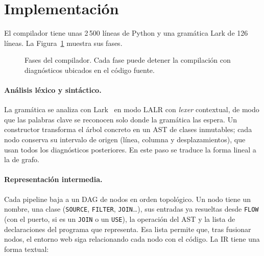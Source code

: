 \documentclass[sigplan,screen,nonacm]{acmart}
\begin{document}
\section{Implementación}
\label{sec:impl}

El compilador tiene unas 2\,500 líneas de Python y una gramática Lark de 126 líneas. La
Figura~\ref{fig:fases} muestra sus fases.

\begin{figure}[t]
\centering
{}
\caption{Fases del compilador. Cada fase puede detener la compilación con diagnósticos
ubicados en el código fuente.}
\label{fig:fases}
\end{figure}

\paragraph{Análisis léxico y sintáctico.}
La gramática se analiza con Lark~\cite{lark} en modo LALR con \emph{lexer} contextual, de
modo que las palabras clave se reconocen solo donde la gramática las espera. Un constructor
transforma el árbol concreto en un AST de clases inmutables; cada nodo conserva su intervalo
de origen (línea, columna y desplazamientos), que usan todos los diagnósticos posteriores.
En este paso se traduce la forma lineal a la de grafo.

\paragraph{Representación intermedia.}
Cada pipeline baja a un DAG de nodos en orden topológico. Un nodo tiene un nombre, una
clase (\texttt{SOURCE}, \texttt{FILTER}, \texttt{JOIN}\ldots), sus entradas ya resueltas desde
\texttt{FLOW} (con el puerto, si es un \texttt{JOIN} o un \texttt{USE}), la operación del AST
y la lista de declaraciones del programa que representa. Esa lista permite que, tras fusionar
nodos, el entorno web siga relacionando cada nodo con el código. La IR tiene una forma textual:
\end{document}
